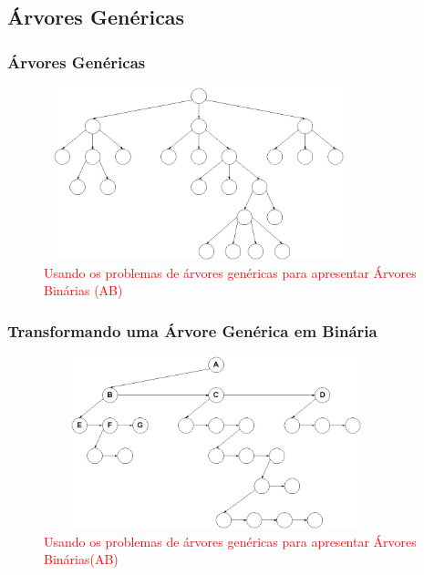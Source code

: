 
\subsection{Árvores Genéricas}

\begin{frame}

    \frametitle{Árvores Genéricas}
     \begin{figure}[!ht]
     \centering
    \includegraphics[width=9cm, height=5cm]{figs/fig_arvores/arv_generica01.jpg}
    \caption{\textcolor{red}{Usando os problemas de árvores genéricas para apresentar Árvores Binárias (AB) }}
    \end{figure}

\end{frame}

\begin{frame}

    \frametitle{Transformando uma Árvore Genérica em Binária}
    
     \begin{figure}[!ht]
     \centering
    \includegraphics[width=10cm, height=5cm]{figs/fig_arvores/arv_generica02.jpg}
    \caption{\textcolor{red}{Usando os problemas de árvores genéricas para apresentar Árvores Binárias(AB)}}
    \end{figure}

\end{frame}

